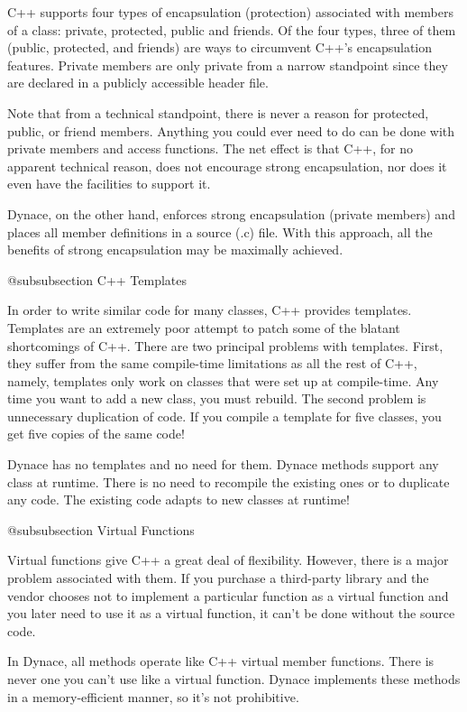 C++ supports four types of encapsulation (protection) associated with
members of a class: private, protected, public and friends.  Of the
four types, three of them (public, protected, and friends) are ways
to circumvent C++'s encapsulation features.  Private members are
only private from a narrow standpoint since they are declared in a
publicly accessible header file.

Note that from a technical standpoint, there is never a reason for
protected, public, or friend members.  Anything you could ever need
to do can be done with private members and access functions.  The
net effect is that C++, for no apparent technical reason, does
not encourage strong encapsulation, nor does it even have the facilities
to support it.

Dynace, on the other hand, enforces strong encapsulation (private members)
and places all member definitions in a source (.c) file.  With this
approach, all the benefits of strong encapsulation may be maximally
achieved.


@subsubsection C++ Templates

In order to write similar code for many classes, C++ provides
templates.  Templates are an extremely poor attempt to patch some
of the blatant shortcomings of C++.  There are two principal problems
with templates.  First, they suffer from the same compile-time limitations
as all the rest of C++, namely, templates only work on classes that
were set up at compile-time.  Any time you want to add a new class,
you must rebuild.  The second problem is unnecessary duplication of code.
If you compile a template for five classes, you get five copies of the
same code!

Dynace has no templates and no need for them.  Dynace methods support any
class at runtime.  There is no need to recompile the existing ones or to
duplicate any code.  The existing code adapts to new classes at
runtime!

@subsubsection Virtual Functions

Virtual functions give C++ a great deal of flexibility.  However,
there is a major problem associated with them.  If you purchase a
third-party library and the vendor chooses not to implement a
particular function as a virtual function and you later need to use it
as a virtual function, it can't be done without the source code.

In Dynace, all methods operate like C++ virtual member functions.  There
is never one you can't use like a virtual function.  Dynace implements
these methods in a memory-efficient manner, so it's not prohibitive.

